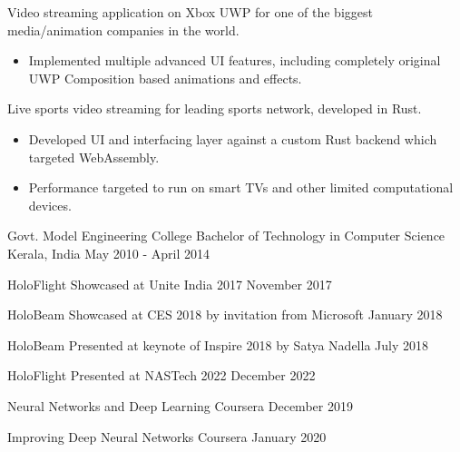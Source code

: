 \documentclass[11pt, a4paper]{awesome-cv}
\begin{document}
\begin{cventries}
{\begin{cvitems}
\begin{itemize}
				\end{itemize}
\vspace{1mm}
			\item Video streaming application on Xbox UWP for one of the biggest media/animation companies in the world.
				\begin{itemize}
					\item Implemented multiple advanced UI features, including completely original UWP Composition based animations and effects.
				\end{itemize}
\vspace{1mm}
			\item Live sports video streaming for leading sports network, developed in Rust.
				\begin{itemize}
					\item Developed UI and interfacing layer against a custom Rust backend which targeted WebAssembly.
					\item Performance targeted to run on smart TVs and other limited computational devices.
				\end{itemize}
		\end{cvitems}
	}
\end{cventries}

\vspace{-1mm}
\begin{cventries}
	\cventry
	{Govt. Model Engineering College} %
	{Bachelor of Technology in Computer Science} %
	{Kerala, India} %
	{May 2010 - April 2014} %
	{
	}
\end{cventries}


\vspace{-6mm}
\begin{cvhonors}
	\cvrecognition
		{HoloFlight} %
		{Showcased at Unite India 2017} %
		{November 2017} %
		{}
		
	\cvrecognition
		{HoloBeam} %
		{Showcased at CES 2018 by invitation from Microsoft} %
		{January 2018} %
		{}
		
	\cvrecognition
		{HoloBeam} %
		{Presented at keynote of Inspire 2018 by Satya Nadella} %
		{July 2018} %
		{}

	\cvrecognition
		{HoloFlight} %
		{Presented at NASTech 2022} %
		{December 2022} %
		{}
\end{cvhonors}

\vspace{2mm}
\begin{cvhonors}
	\cvcertification
	{Neural Networks and Deep Learning} %
	{Coursera} %
	{December 2019} %
	{}

	\cvcertification
	{Improving Deep Neural Networks} %
	{Coursera} %
	{January 2020} %
	{}
\end{cvhonors}
\end{document}
